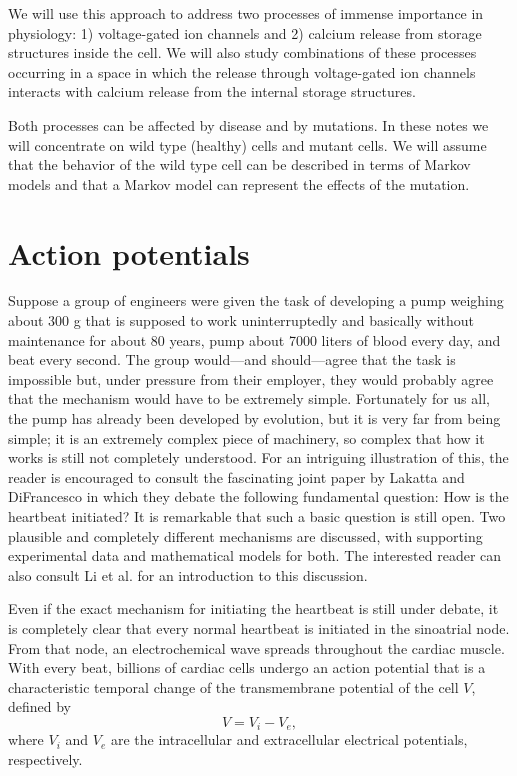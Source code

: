 We will use this approach to address two processes of immense importance in physiology:
1) voltage-gated ion channels and 2) calcium release from storage structures inside the cell. We will also study combinations of these processes occurring in a space in which the release through voltage-gated ion channels interacts with calcium release from the internal storage structures.

Both processes can be affected by disease and by mutations. In these notes we will concentrate on wild type (healthy) cells and mutant cells. We will assume that the behavior of the wild type cell can be described in terms of Markov models  and that a Markov model can represent the effects of the mutation.

\section{Action potentials}

Suppose a group of engineers were given the task of developing a pump weighing about 300 g that is supposed to work uninterruptedly and basically without maintenance for about 80 years, pump about 7000 liters of blood every day, and beat every second. The group would---and should---agree that the task is impossible but, under pressure from their employer, they would probably agree that the mechanism would have to be extremely simple. Fortunately for us all, the pump has already been developed by evolution, but it is very far from being simple; it is an extremely complex piece of machinery, so complex that how it works  is still not completely understood. For an intriguing illustration of this, the reader is encouraged to consult the fascinating joint paper by Lakatta and DiFrancesco \cite{Lakatta2009} in which they debate the following fundamental question: How is the heartbeat initiated? It is remarkable that such a basic question is still open. Two plausible and completely different mechanisms are discussed, with supporting experimental data and mathematical models for both. The interested reader can also consult Li et al. \cite{Li2013} for an introduction to this discussion.

Even if the exact mechanism for initiating the heartbeat is still under debate, it is completely clear that every normal heartbeat is initiated in the sinoatrial node. From that node, an electrochemical wave spreads throughout the cardiac muscle. With every beat, billions of cardiac cells undergo an action potential that is a characteristic temporal change of the transmembrane potential of the cell $V$, defined by
\[ V = V_i-V_e, \]
where $V_i$ and $V_e$ are the intracellular and extracellular electrical potentials, respectively.

